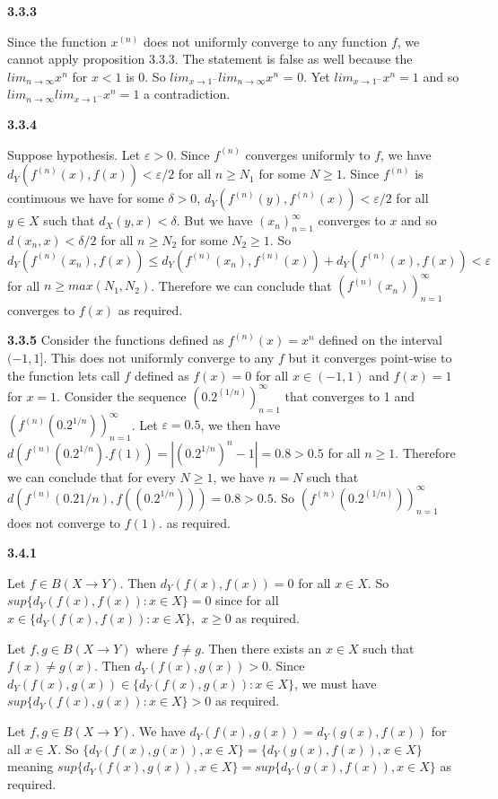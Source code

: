 \documentclass[12pt]{article}
\begin{document}
\textbf{3.3.3}

Since the function $x^{(n)}$ does not uniformly converge to any function $f$, we cannot apply proposition 3.3.3. The statement is false as well because the $lim_{n\to \infty}x^n$ for $x<1$ is $0$. So $lim_{x\to 1^-}lim_{n\to \infty}x^n$ = 0. Yet $lim_{x\to 1^-}x^n = 1$ and so $lim_{n\to \infty}lim_{x\to 1^-}x^n = 1$ a contradiction. 

\textbf{3.3.4}

Suppose hypothesis. Let $\varepsilon >0$. Since $f^{(n)}$ converges uniformly to $f$, we have $d_Y(f^{(n)}(x),f(x)) <\varepsilon/2$ for all $n\geq N_1$ for some $N\geq 1$. Since $f^{(n)}$ is continuous we have for some $\delta >0$, $d_Y(f^{(n)}(y),f^{(n)}(x)) < \varepsilon/2$ for all $y\in X$ such that $d_X(y,x)< \delta$. But we have $(x_n)^\infty_{n=1}$ converges to $x$ and so $d(x_n,x) < \delta/2$ for all $n\geq N_2$ for some $N_2 \geq 1$. So $d_Y(f^{(n)}(x_n), f(x))\leq d_Y(f^{(n)}(x_n),f^{(n)}(x))+d_Y(f^{(n)}(x),f(x)) < \varepsilon$ for all $n\geq max(N_1,N_2)$. Therefore we can conclude that $(f^{(n)}(x_n))^\infty_{n=1}$ converges to $f(x)$ as required. 

\textbf{3.3.5}
Consider the functions defined as $f^{(n)}(x) = x^{n}$ defined on the interval $(-1,1]$. This does not uniformly converge to any $f$ but it converges point-wise to the function lets call $f$ defined as $f(x) = 0$ for all $ x\in (-1,1)$ and $f(x) = 1$ for $x=1$. Consider the sequence $(0.2^{(1/n)})^\infty_{n=1}$ that converges to 1 and $(f^{(n)}(0.2^{1/n}))^\infty_{n=1}$. Let $ \varepsilon = 0.5$, we then have $d(f^{(n)}(0.2^{1/n}). f(1) )  = |(0.2^{1/n})^n-1| = 0.8 > 0.5$ for all $n\geq 1$. Therefore we can conclude that for every $N\geq 1$, we have $n=N$ such that $d(f^{(n)}(0.2{1/n}), f((0.2^{1/n}))) = 0.8 > 0.5$. So $(f^{(n)}(0.2^{(1/n)}))^\infty_{n=1}$ does not converge to $f(1)$. as required.

\textbf{3.4.1}

Let $f\in B(X\to Y)$. Then $d_Y(f(x), f(x)) = 0$ for all $x\in X$. So $sup\{d_Y(f(x), f(x)): x\in X\} = 0$ since for all $x\in \{d_Y(f(x), f(x)): x\in X\},$ $x\geq 0$ as required.

Let $f,g \in B(X\to Y)$ where $f\neq g$. Then there exists an $x\in X$ such that $f(x) \neq g(x)$. Then $d_Y(f(x), g(x)) >0$.  Since $d_Y(f(x), g(x))\in \{d_Y(f(x), g(x)): x\in X\}$, we must have $sup \{d_Y(f(x), g(x)): x\in X\}>0$ as required. 

Let $f,g\in B(X\to Y)$. We have $d_Y(f(x),g(x)) = d_Y(g(x), f(x))$ for all $x\in X$. So $ \{d_Y(f(x),g(x)), x\in X\} = \{d_Y(g(x),f(x)), x\in X\} $ meaning $sup\{d_Y(f(x),g(x)), x\in X\} = sup \{d_Y(g(x),f(x)), x\in X\} $ as required.
\end{document}
